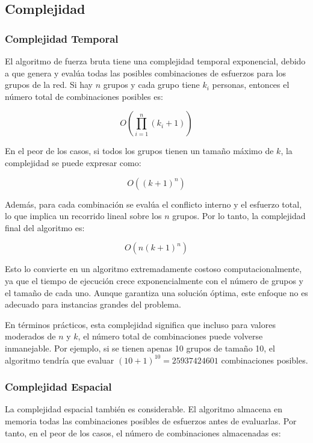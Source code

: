 \documentclass[11pt,letter]{article}
\begin{document}

\subsection{Complejidad}
\subsubsection{Complejidad Temporal}

El algoritmo de fuerza bruta tiene una complejidad temporal exponencial, debido a que genera y evalúa todas las posibles combinaciones de esfuerzos para los grupos de la red. Si hay $n$ grupos y cada grupo tiene $k_i$ personas, entonces el número total de combinaciones posibles es:

\[
O\left(\prod_{i=1}^{n}(k_i + 1)\right)
\]

En el peor de los casos, si todos los grupos tienen un tamaño máximo de $k$, la complejidad se puede expresar como:

\[
O\left((k + 1)^n\right)
\]

Además, para cada combinación se evalúa el conflicto interno y el esfuerzo total, lo que implica un recorrido lineal sobre los $n$ grupos. Por lo tanto, la complejidad final del algoritmo es:

\[
O\left(n (k + 1)^n\right)
\]

Esto lo convierte en un algoritmo extremadamente costoso computacionalmente, ya que el tiempo de ejecución crece exponencialmente con el número de grupos y el tamaño de cada uno. Aunque garantiza una solución óptima, este enfoque no es adecuado para instancias grandes del problema.

En términos prácticos, esta complejidad significa que incluso para valores moderados de $n$ y $k$, el número total de combinaciones puede volverse inmanejable. Por ejemplo, si se tienen apenas 10 grupos de tamaño 10, el algoritmo tendría que evaluar $(10 + 1)^{10} = 25937424601$ combinaciones posibles.

\subsubsection{Complejidad Espacial}

La complejidad espacial también es considerable. El algoritmo almacena en memoria todas las combinaciones posibles de esfuerzos antes de evaluarlas. Por tanto, en el peor de los casos, el número de combinaciones almacenadas es:
\end{document}
